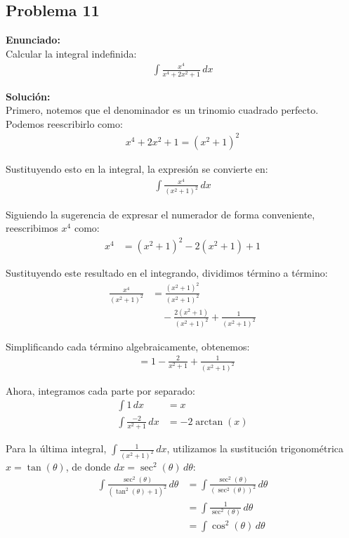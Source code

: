 \subsection*{Problema 11}

\noindent\textbf{Enunciado:} \\
Calcular la integral indefinida:
\begin{align*}
\int \frac{x^4}{x^4 + 2x^2 + 1} \, dx
\end{align*}

\noindent\textbf{Solución:} \\
Primero, notemos que el denominador es un trinomio cuadrado perfecto. Podemos reescribirlo como:
\begin{align*}
x^4 + 2x^2 + 1 = (x^2 + 1)^2
\end{align*}

Sustituyendo esto en la integral, la expresión se convierte en:
\begin{align*}
\int \frac{x^4}{(x^2 + 1)^2} \, dx
\end{align*}

Siguiendo la sugerencia de expresar el numerador de forma conveniente, reescribimos $x^4$ como:
\begin{align*}
x^4 &= (x^2 + 1)^2 - 2(x^2 + 1) + 1
\end{align*}

Sustituyendo este resultado en el integrando, dividimos término a término:
\begin{align*}
\frac{x^4}{(x^2+1)^2} &= \frac{(x^2+1)^2}{(x^2+1)^2} \\
&\quad - \frac{2(x^2+1)}{(x^2+1)^2} + \frac{1}{(x^2+1)^2}
\end{align*}

Simplificando cada término algebraicamente, obtenemos:
\begin{align*}
&= 1 - \frac{2}{x^2+1} + \frac{1}{(x^2+1)^2}
\end{align*}

Ahora, integramos cada parte por separado:
\begin{align*}
\int 1 \, dx &= x \\
\int \frac{-2}{x^2+1} \, dx &= -2 \arctan(x)
\end{align*}

Para la última integral, $\int \frac{1}{(x^2+1)^2} \, dx$, utilizamos la sustitución trigonométrica $x = \tan(\theta)$, de donde $dx = \sec^2(\theta) \, d\theta$:
\begin{align*}
\int \frac{\sec^2(\theta)}{(\tan^2(\theta)+1)^2} \, d\theta &= \int \frac{\sec^2(\theta)}{(\sec^2(\theta))^2} \, d\theta \\
&= \int \frac{1}{\sec^2(\theta)} \, d\theta \\
&= \int \cos^2(\theta) \, d\theta
\end{align*}


